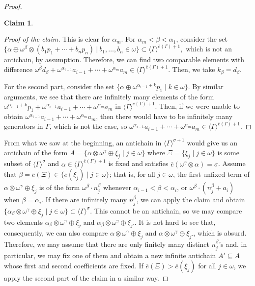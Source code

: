 \documentclass[reqno]{amsart}
\theoremstyle{definition}
\theoremstyle{definition}
\theoremstyle{plain} %
\newtheorem*{claim}{Claim}
\begin{document}
\begin{proof}
\begin{claim}
\end{claim}
\begin{proof}[Proof of the claim] This is clear for $\alpha_m$. For $\alpha_m<\beta<\alpha_1$, consider the set $ \{\alpha\oplus\omega^{\beta}\otimes(b_1p_1+\cdots+b_np_n) \ |\ b_1,\dots,b_n\in\omega\}\subset\langle\Gamma \rangle^{\overline{e}(\Gamma)+1},$ which is not an antichain, by assumption. Therefore, we can find two comparable elements with difference $\omega^{\beta}d_\beta+\omega^{\alpha_{i-1}} a_{i-1} + \cdots + \omega^{\alpha_m} a_m\in\langle\Gamma \rangle^{\overline{e}(\Gamma)+1}$. Then, we take $k_{\beta} = d_\beta$.

For the second part, consider the set $\{\alpha \oplus \omega^{\alpha_{i-1}+k} p_1 \mid k \in \omega\}$. By similar arguments, we see that there are infinitely many elements of the form $\omega^{\alpha_{i-1}+k} p_1+ \omega^{\alpha_{i-1}} a_{i-1}+ \cdots + \omega^{\alpha_m} a_m $ in $\langle \Gamma \rangle^{\overline{e}(\Gamma)+1}$. Then, if we were unable to obtain $\omega^{\alpha_{i-1}} a_{i-1} + \cdots + \omega^{\alpha_m} a_m$, then there would have to be infinitely many generators in $\Gamma$, which is not the case, so $\omega^{\alpha_{i-1}} a_{i-1} + \cdots + \omega^{\alpha_m} a_m\in \langle \Gamma \rangle^{\overline{e}(\Gamma)+1}$.
\end{proof}
    From what we saw at the beginning, an antichain in $\langle\Gamma\rangle^{\sigma+1}$ would give us an antichain of the form $A=\{\alpha \otimes \omega^{\gamma} \oplus \xi_j \mid j \in \omega\}$ where $\Xi=\{\xi_j \mid j\in\omega\}$ is some subset of $\langle \Gamma \rangle^{\sigma } $ and $\alpha\in\langle \Gamma \rangle^{\overline{e}(\Gamma)+1}$ is fixed and satisfies $ \overline{e}(\omega^\gamma\otimes\alpha)=\sigma$. Assume that $\beta=\overline{e}(\Xi)\in\{\overline{e}(\xi_j)\mid j\in\omega\}$; that is,  for all $j\in\omega$, the first unfixed term of $\alpha \otimes \omega^{\gamma} \oplus \xi_j$ is of the form $\omega^\beta \cdot n_j^\beta$ whenever $\alpha_{i-1} < \beta < \alpha_i$, or $\omega^\beta \cdot (n_j^\beta + a_i)$ when $\beta = \alpha_i$. If there are infinitely many $n_j^\beta$, we can apply the claim and obtain $\{\alpha_\beta \otimes \omega^{\gamma} \oplus \xi_j \mid j \in \omega\}\subset\langle\Gamma\rangle^\sigma$. This cannot be an antichain, so we may compare two elements $\alpha_\beta \otimes \omega^{\gamma} \oplus \xi_j$ and $\alpha_\beta \otimes \omega^{\gamma} \oplus \xi_{j'}$. It is not hard to see that, consequently, we can also compare $\alpha \otimes \omega^{\gamma} \oplus \xi_j$ and $\alpha \otimes \omega^{\gamma} \oplus \xi_{j'}$, which is absurd. Therefore, we may assume that there are only finitely many distinct $n_j^\beta$’s and, in particular, we may fix one of them and obtain a new infinite antichain $A' \subseteq A$ whose first and second coefficients are fixed. If $\overline{e}(\Xi)>\overline{e}(\xi_j)$ for all $j\in\omega$, we apply the second part of the claim in a similar way.
    

\end{proof}
\end{document}
